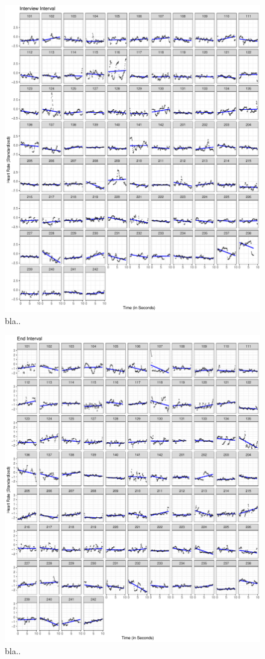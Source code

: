 \documentclass[preprint, 3p,
authoryear]{elsarticle} %
\begin{document}
\begin{figure}[htbp]
  \centering
  \includegraphics[width=1\textwidth]{plots_publication/plot_interview_appendix.pdf}
  \caption{bla..}
  \label{interview}
\end{figure}

\begin{figure}[htbp]
  \centering
  \includegraphics[width=1\textwidth]{plots_publication/plot_end_appendix.pdf}
  \caption{bla..}
  \label{end}
\end{figure}

\newpage


\end{document}
